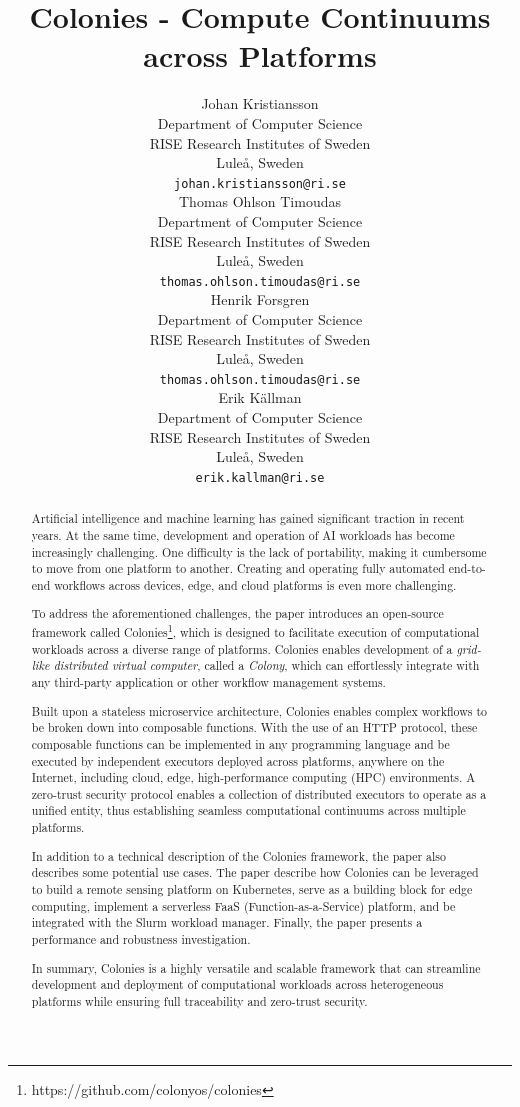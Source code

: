 \documentclass{article}
\title{Colonies - Compute Continuums across Platforms}
\author{{\hspace{1mm}Johan Kristiansson} \\
	Department of Computer Science \\
	RISE Research Institutes of Sweden \\
	Luleå, Sweden \\
	\texttt{johan.kristiansson@ri.se} \\
	\And
	{\hspace{1mm}Thomas Ohlson Timoudas} \\
	Department of Computer Science \\
	RISE Research Institutes of Sweden \\
	Luleå, Sweden \\
	\texttt{thomas.ohlson.timoudas@ri.se} \\
	\And
	{\hspace{1mm}Henrik Forsgren} \\
	Department of Computer Science \\
	RISE Research Institutes of Sweden \\
	Luleå, Sweden \\
	\texttt{thomas.ohlson.timoudas@ri.se} \\
	\And
	{\hspace{1mm}Erik Källman} \\
	Department of Computer Science \\
	RISE Research Institutes of Sweden \\
	Luleå, Sweden \\
	\texttt{erik.kallman@ri.se} \\
}
\begin{document}
\maketitle

\begin{abstract}
Artificial intelligence and machine learning has gained significant traction in recent years. At the same time, development and operation of AI workloads has become increasingly challenging. One difficulty is the lack of portability, making it cumbersome to move from one platform to another. Creating and operating fully automated end-to-end workflows across devices, edge, and cloud platforms is even more challenging.

To address the aforementioned challenges, the paper introduces an open-source framework called Colonies\footnote{https://github.com/colonyos/colonies}, which is designed to facilitate execution of computational workloads across a diverse range of platforms. Colonies enables development of a \emph{grid-like distributed virtual computer}, called a \emph{Colony}, which can effortlessly integrate with any third-party application or other workflow management systems.

Built upon a stateless microservice architecture, Colonies enables complex workflows to be broken down into composable functions. With the use of an HTTP protocol, these composable functions can be implemented in any programming language and be executed by independent executors deployed across platforms, anywhere on the Internet, including cloud, edge, high-performance computing (HPC) environments. A zero-trust security protocol enables a collection of distributed executors to operate as a unified entity, thus establishing seamless computational continuums across multiple platforms.

In addition to a technical description of the Colonies framework, the paper also describes some potential use cases. The paper describe how Colonies can be leveraged to build a remote sensing platform on Kubernetes, serve as a building block for edge computing, implement a serverless FaaS (Function-as-a-Service) platform, and be integrated with the Slurm workload manager. Finally, the paper presents a performance and robustness investigation.

In summary, Colonies is a highly versatile and scalable framework that can streamline development and deployment of computational workloads across heterogeneous platforms while ensuring full traceability and zero-trust security.
\end{abstract}
\end{document}
